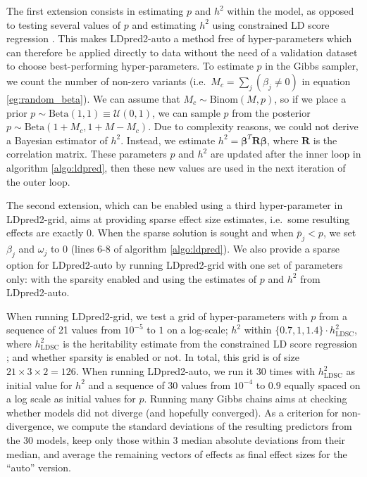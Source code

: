 \documentclass{bioinfo}
\begin{document}
\begin{methods}
The first extension consists in estimating $p$ and $h^2$ within the model, as opposed to testing several values of $p$ and estimating $h^2$ using constrained LD score regression \cite[]{bulik2015ld}. This makes LDpred2-auto a method free of hyper-parameters which can therefore be applied directly to data without the need of a validation dataset to choose best-performing hyper-parameters.
To estimate $p$ in the Gibbs sampler, we count the number of non-zero variants (i.e.\ $M_c = \sum_j(\beta_j \neq 0)$ in equation \ref{eg:random_beta}). 
We can assume that $M_c \sim \text{Binom}(M, p)$, so if we place a prior $p \sim \text{Beta}(1, 1) \equiv \mathcal{U}(0, 1)$, we can sample $p$ from the posterior $p \sim \text{Beta}(1 + M_c, 1 + M - M_c)$.
Due to complexity reasons, we could not derive a Bayesian estimator of $h^2$. Instead, we estimate $h^2 = \boldsymbol{\beta}^T \boldsymbol{R} \boldsymbol{\beta}$, where $\boldsymbol{R}$ is the correlation matrix.
These parameters $p$ and $h^2$ are updated after the inner loop in algorithm \ref{algo:ldpred}, then these new values are used in the next iteration of the outer loop.

The second extension, which can be enabled using a third hyper-parameter in LDpred2-grid, aims at providing sparse effect size estimates, i.e.\ some resulting effects are exactly 0.
When the sparse solution is sought and when $\bar{p}_j < p$, we set $\beta_j$ and $\omega_j$ to 0 (lines 6-8 of algorithm \ref{algo:ldpred}).
We also provide a sparse option for LDpred2-auto by running LDpred2-grid with one set of parameters only: with the sparsity enabled and using the estimates of $p$ and $h^2$ from LDpred2-auto.

When running LDpred2-grid, we test a grid of hyper-parameters with $p$ from a sequence of 21 values from $10^{-5}$ to $1$ on a log-scale; $h^2$ within $\{0.7, 1, 1.4\} \cdot h^2_\text{LDSC}$, where $h^2_\text{LDSC}$ is the heritability estimate from the constrained LD score regression \cite{bulik2015ld}; and whether sparsity is enabled or not.
In total, this grid is of size $21 \times 3 \times 2 = 126$.
When running LDpred2-auto, we run it 30 times with $h^2_\text{LDSC}$ as initial value for $h^2$ and a sequence of 30 values from $10^{-4}$ to $0.9$ equally spaced on a log scale as initial values for $p$.
Running many Gibbs chains aims at checking whether models did not diverge (and hopefully converged).
As a criterion for non-divergence, we compute the standard deviations of the resulting predictors from the 30 models, keep only those within 3 median absolute deviations from their median, and average the remaining vectors of effects as final effect sizes for the ``auto'' version.



\end{methods}
\end{document}
